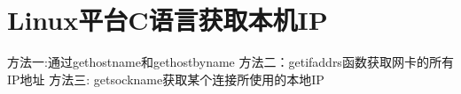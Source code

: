 \section{Linux平台C语言获取本机IP}
方法一:通过gethostname和gethostbyname
方法二：getifaddrs函数获取网卡的所有IP地址
方法三: getsockname获取某个连接所使用的本地IP

